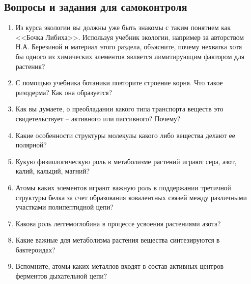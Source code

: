 \subsection*{Вопросы и задания для самоконтроля}

\begin{enumerate}
\item Из курса экологии вы должны уже быть знакомы с таким понятием как <<\hypertarget{}{Бочка Либиха}>>. Используя учебник экологии, например за авторством Н.А. Березиной \cite{berezina_2009} и материал этого раздела, объясните, почему нехватка хотя бы одного из химических элементов является лимитирующим фактором для растения?
\item С помощью учебника ботаники повторите строение корня. Что такое \hypertarget{question_rizoderma}{ризодерма}? Как она образуется?
\item Как вы думаете, о преобладании какого типа \hypertarget{what_is_transport_type}{транспорта} веществ это свидетельствует -- активного или пассивного? Почему?
\item Какие особенности структуры молекулы какого либо вещества делают ее \hypertarget{polarMolecula}{полярной}?
\item Кукую физиологическую роль в метаболизме растений играют сера, азот, калий, кальций, магний?
\item Атомы каких элементов играют важную роль в поддержании третичной структуры белка за счет образования ковалентных связей между различными участками полипептидной цепи?
\item Какова роль леггемоглобина в процессе усвоения растениями азота?
\item Какие важные для метаболизма растения вещества синтезируются в бактероидах?
\item Вспомните, атомы каких металлов входят в состав активных центров ферментов дыхательной цепи?
\end{enumerate}

